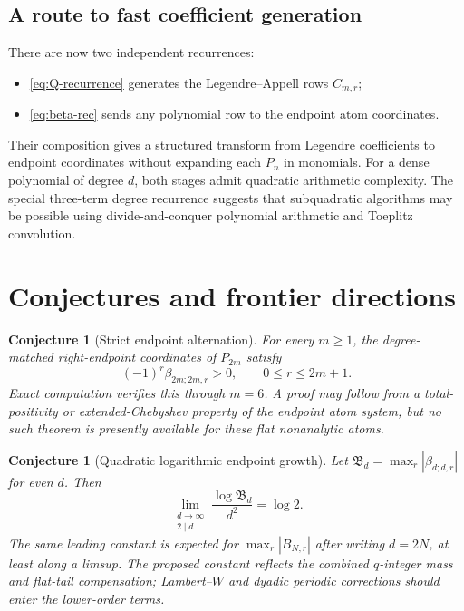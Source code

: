 \documentclass[11pt,oneside]{article}
\newtheorem{conjecture}[theorem]{Conjecture}
\theoremstyle{definition}
\theoremstyle{remark}
\begin{document}
\subsection{A route to fast coefficient generation}
There are now two independent recurrences:
\begin{itemize}
\item \eqref{eq:Q-recurrence} generates the Legendre--Appell rows $C_{m,r}$;
\item \eqref{eq:beta-rec} sends any polynomial row to the endpoint atom
coordinates.
\end{itemize}
Their composition gives a structured transform from Legendre coefficients to
endpoint coordinates without expanding each $P_n$ in monomials.  For a dense
polynomial of degree $d$, both stages admit quadratic arithmetic complexity.
The special three-term degree recurrence suggests that subquadratic algorithms
may be possible using divide-and-conquer polynomial arithmetic and Toeplitz
convolution.

\section{Conjectures and frontier directions}
\label{sec:conjectures}

\begin{conjecture}[Strict endpoint alternation]
\label{conj:alternation}
For every $m\ge1$, the degree-matched right-endpoint coordinates of $P_{2m}$
satisfy
\begin{equation}
 \boxed{(-1)^r\beta_{2m;2m,r}>0,
 \qquad0\le r\le2m+1.}
 \label{eq:alternation-conj}
\end{equation}
Exact computation verifies this through $m=6$.  A proof may follow from a
total-positivity or extended-Chebyshev property of the endpoint atom system,
but no such theorem is presently available for these flat nonanalytic atoms.
\end{conjecture}

\begin{conjecture}[Quadratic logarithmic endpoint growth]
\label{conj:growth}
Let
$\mathfrak B_d=\max_r|\beta_{d;d,r}|$ for even $d$.  Then
\begin{equation}
 \boxed{
 \lim_{\substack{d\to\infty\\2\mid d}}
 \frac{\log\mathfrak B_d}{d^2}=\log2.}
 \label{eq:beta-growth-conj}
\end{equation}
The same leading constant is expected for
$\max_r|B_{N,r}|$ after writing $d=2N$, at least along a limsup.  The proposed
constant reflects the combined $q$-integer mass and flat-tail compensation;
Lambert--$W$ and dyadic periodic corrections should enter the lower-order
terms.
\end{conjecture}
\end{document}
